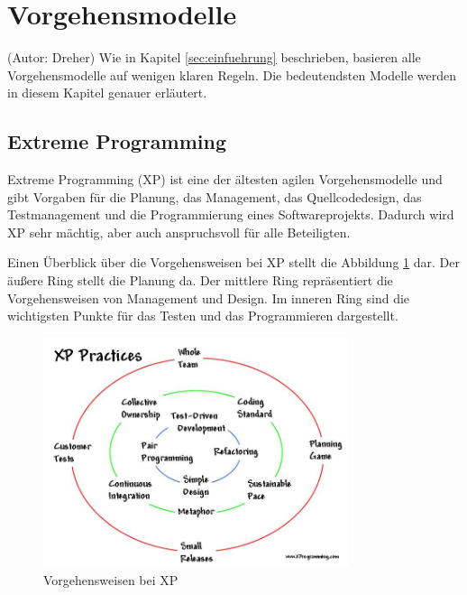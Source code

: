 \section{Vorgehensmodelle}
(Autor: Dreher)
Wie in Kapitel \ref{sec:einfuehrung} beschrieben, basieren alle Vorgehensmodelle auf wenigen klaren Regeln. Die bedeutendsten Modelle werden in diesem Kapitel genauer erläutert.

\subsection{Extreme Programming}
Extreme Programming (XP) ist eine der ältesten agilen Vorgehensmodelle und gibt Vorgaben für die Planung, das Management, das Quellcodedesign, das Testmanagement und die Programmierung eines Softwareprojekts. Dadurch wird XP sehr mächtig, aber auch anspruchsvoll für alle Beteiligten. \cite[S. 13]{bib:wolfRoock} \cite{bib:xp}

Einen Überblick über die Vorgehensweisen bei XP stellt die Abbildung \ref{fig:xppractices} dar. Der äußere Ring stellt die Planung da. Der mittlere Ring repräsentiert die Vorgehensweisen von Management und Design. Im inneren Ring sind die wichtigsten Punkte für das Testen und das Programmieren dargestellt.

\begin{figure}[h]
  \centering
  \includegraphics[width=0.8\textwidth]{images/xpCircles}
  \caption{Vorgehensweisen bei XP \cite{bib:xprogamming}}
  \label{fig:xppractices}
\end{figure}

